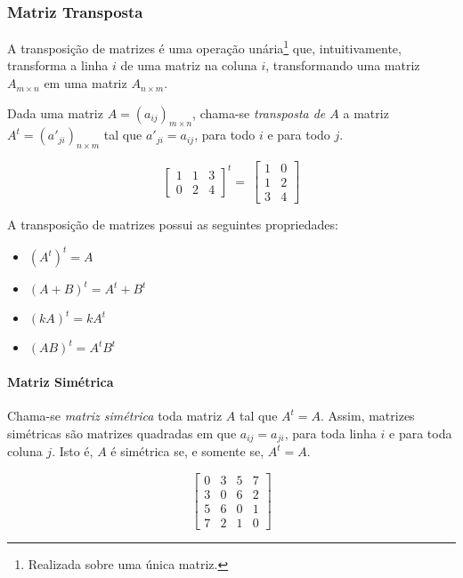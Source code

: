 \subsubsection{Matriz Transposta}
A transposição de matrizes é uma operação unária\footnote{Realizada sobre uma única matriz.} que, intuitivamente, transforma a linha $i$ de uma matriz na coluna $i$, transformando uma matriz $A_{m\times n}$ em uma matriz $A_{n\times m}$.
\begin{df}
Dada uma matriz $A=(a_{ij})_{m\times n}$, chama-se \emph{transposta de $A$} a matriz $A^t=(a'_{ji})_{n\times m}$ tal que $a'_{ji}=a_{ij}$, para todo $i$ e para todo $j$.
\end{df}
\begin{exemplo}
\[\begin{bmatrix}
1 & 1 & 3 \\
0 & 2 & 4
\end{bmatrix}^t= \:
\begin{bmatrix}
1 & 0\\
1 & 2\\
3 & 4
\end{bmatrix}\]
\end{exemplo}

A transposição de matrizes possui as seguintes propriedades:
\begin{itemize}
\item $(A^t)^t=A$
\item $(A+B)^t=A^t+B^t$
\item $(kA)^t=kA^t$
\item $(AB)^t=A^tB^t$
\end{itemize}
\paragraph{Matriz Simétrica}
\begin{df}
Chama-se \emph{matriz simétrica} toda matriz $A$ tal que $A^t=A$. Assim, matrizes simétricas são matrizes quadradas em que $a_{ij}=a_{ji}$, para toda linha $i$ e para toda coluna $j$.  Isto é, $A$ é simétrica se, e somente se, $A^{t} = A$. 
\end{df}
\begin{exemplo}
\[\begin{bmatrix}
0 & 3 & 5 & 7 \\
3 & 0 & 6 & 2 \\
5 & 6 & 0 & 1 \\
7 & 2 & 1 & 0
\end{bmatrix}\]
\end{exemplo}


